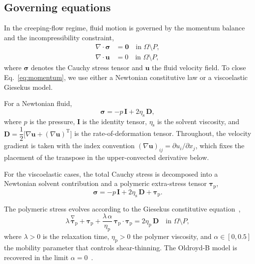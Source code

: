 \documentclass{elsarticle}
\renewcommand{\vec}[1]{\boldsymbol{#1}}
\newcommand{\ten}[1]{\boldsymbol{#1}}
\begin{document}
\subsection{Governing equations}

In the creeping-flow regime, fluid motion is governed by the
momentum balance and the incompressibility constraint,
\begin{align}
\nabla \cdot \ten{\sigma} &= \vec{0}
\quad \text{in } \Omega \setminus P,
\label{eq:momentum} \\
\nabla \cdot \vec{u} &= 0
\quad \text{in } \Omega \setminus P,
\label{eq:continuity}
\end{align}
where $\ten{\sigma}$ denotes the Cauchy stress tensor and $\vec{u}$
the fluid velocity field. To close Eq.~\eqref{eq:momentum}, we use
either a Newtonian constitutive law or a viscoelastic Giesekus model.

For a Newtonian fluid,
\begin{equation}
\ten{\sigma} = -p\,\ten{I} + 2\eta_{\mathrm{s}}\,\ten{D},
\label{eq:sigma_newton}
\end{equation}
where $p$ is the pressure, $\ten{I}$ is the identity tensor,
$\eta_{\mathrm{s}}$ is the solvent viscosity, and
$\ten{D} = \dfrac{1}{2}\bigl[\nabla\vec{u}
            + (\nabla\vec{u})^{\mathrm{T}}\bigr]$
is the rate-of-deformation tensor. Throughout, the velocity gradient is
taken with the index convention
$(\nabla\vec{u})_{ij} = \partial u_{i}/\partial x_{j}$, which fixes the
placement of the transpose in the upper-convected derivative below.

For the viscoelastic cases, the total Cauchy stress is decomposed into
a Newtonian solvent contribution and a polymeric extra-stress tensor
$\ten{\tau}_{\mathrm{p}}$,
\begin{equation}
\ten{\sigma} = -p\,\ten{I} + 2\eta_{\mathrm{s}}\,\ten{D}
             + \ten{\tau}_{\mathrm{p}}.
\label{eq:sigma_ve}
\end{equation}

The polymeric stress evolves according to the Giesekus constitutive
equation~\cite{giesekus1982simple,bird1987dpl1},
\begin{equation}
\lambda\,\overset{\nabla}{\ten{\tau}}_{\mathrm{p}}
+ \ten{\tau}_{\mathrm{p}}
+ \frac{\lambda\,\alpha}{\eta_{\mathrm{p}}}\,
  \ten{\tau}_{\mathrm{p}}\cdot\ten{\tau}_{\mathrm{p}}
= 2\eta_{\mathrm{p}}\,\ten{D}
\quad \text{in } \Omega \setminus P,
\label{eq:Giesekus_tau}
\end{equation}
where $\lambda > 0$ is the relaxation time, $\eta_{\mathrm{p}} > 0$
the polymer viscosity, and $\alpha \in [0,0.5]$ the mobility parameter
that controls shear-thinning. The Oldroyd-B model is recovered in the
limit $\alpha = 0$~\cite{oldroyd1950rheological}.
\end{document}
